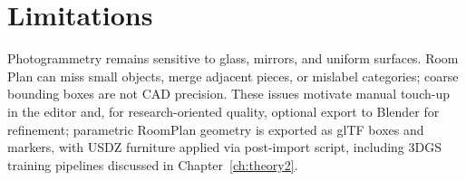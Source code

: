 \section{Limitations}
\label{sec:limitations_capture}

Photogrammetry remains sensitive to glass, mirrors, and uniform surfaces. Room Plan can miss small objects, merge adjacent pieces, or mislabel categories; coarse bounding boxes are not CAD precision. These issues motivate manual touch-up in the editor and, for research-oriented quality, optional export to Blender for refinement; parametric RoomPlan geometry is exported as glTF boxes and markers, with USDZ furniture applied via post-import script, including 3DGS training pipelines discussed in Chapter~\ref{ch:theory2}.  

